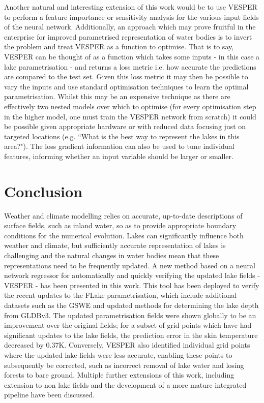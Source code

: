 \documentclass[hess, twostagejnl]{copernicus}
\begin{document}
Another natural and interesting extension of this work would be to use VESPER to perform a feature importance or sensitivity analysis for the various input fields of the neural network. Additionally, an approach which may prove fruitful in the enterprise for improved parametrised representation of water bodies is to invert the problem and treat VESPER as a function to optimise. That is to say, VESPER can be thought of as a function which takes some inputs - in this case a lake parametrisation - and returns a loss metric i.e. how accurate the predictions are compared to the test set. Given this loss metric it may then be possible to vary the inputs and use standard optimisation techniques to learn the optimal parametrisation. Whilst this may be an expensive technique as there are effectively two nested models over which to optimise (for every optimisation step in the higher model, one must train the VESPER network from scratch) it could be possible given appropriate hardware or with reduced data focusing just on targeted locations (e.g. “What is the best way to represent the lakes in this area?"). The loss gradient information can also be used to tune individual features, informing whether an input variable should be larger or smaller.




\section{Conclusion}\label{sec:conclusion}
Weather and climate modelling relies on accurate, up-to-date descriptions of surface fields, such as inland water, so as to provide appropriate boundary conditions for the numerical evolution. Lakes can significantly influence both weather and climate, but sufficiently  accurate  representation  of  lakes  is  challenging  and  the  natural  changes  in  water  bodies  mean  that  these representations  need  to  be  frequently  updated.  A  new  method  based  on  a  neural  network  regressor  for  automatically  and quickly verifying the updated lake fields - VESPER - has been presented in this work. This tool has been deployed to verify the recent updates to the FLake parametrisation, which include additional datasets such as the GSWE and updated methods for determining the lake depth from GLDBv3. The updated parametrisation fields were shown globally to be an improvement over the original fields; for a subset of grid points which have had significant updates to the lake fields, the prediction error in the skin temperature decreased by 0.37K. Conversely, VESPER also identified individual grid points where the updated lake fields were less accurate, enabling these points to subsequently be corrected, such as incorrect removal of lake water and losing forests to bare ground. Multiple further extensions of this work, including extension to non lake fields and the development of a more mature integrated pipeline have been discussed.
\end{document}
